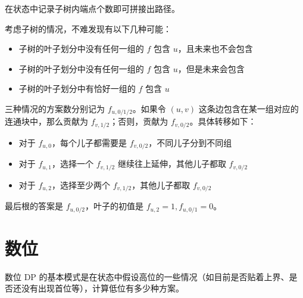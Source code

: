 在状态中记录子树内端点个数即可拼接出路径。


\begin{example}
\end{example}
\begin{solution}
    考虑子树的情况，不难发现有以下几种可能：
    \begin{itemize}
        \item 子树的叶子划分中没有任何一组的 $f$ 包含 $u$，且未来也不会包含
        \item 子树的叶子划分中没有任何一组的 $f$ 包含 $u$，但是未来会包含
        \item 子树的叶子划分中有恰好一组的 $f$ 包含 $u$
    \end{itemize}
    三种情况的方案数分别记为 $f_{u,0/1/2}$。如果令 $(u,v)$ 这条边包含在某一组对应的连通块中，那么贡献为 $f_{v,1/2}$；否则，贡献为 $f_{v,0/2}$。具体转移如下：
    \begin{itemize}
        \item 对于 $f_{u,0}$，每个儿子都需要是 $f_{v,0/2}$，不同儿子分到不同组
        \item 对于 $f_{u,1}$，选择一个 $f_{v,1/2}$ 继续往上延伸，其他儿子都取 $f_{v,0/2}$
        \item 对于 $f_{u,2}$，选择至少两个 $f_{v,1/2}$，其他儿子都取 $f_{v,0/2}$
    \end{itemize}
    最后根的答案是 $f_{u,0/2}$，叶子的初值是 $f_{u,2}=1,f_{u,0/1}=0$。
\end{solution}


\begin{example}[{[SCOI2015] 小凸玩密室}]
    
\end{example}

\begin{exercise}[{[COCI 2014/2015 \#1] Kamp}]
    
\end{exercise}

\begin{exercise}[{[COCI 2020/2021 \#2] Svjetlo}]
    
\end{exercise}

\section{数位}

数位 DP 的基本模式是在状态中假设高位的一些情况（如目前是否贴着上界、是否还没有出现首位等），计算低位有多少种方案。

